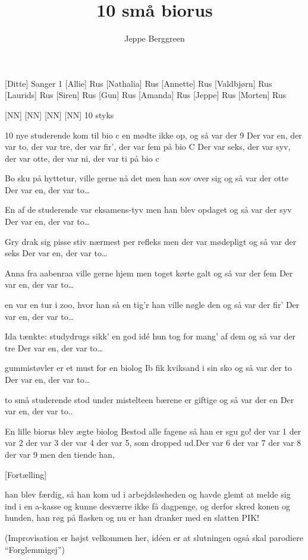 \documentclass[a4paper,11pt]{article}
\title{10 små biorus}
\author{Jeppe Berggreen}
\begin{document}
\maketitle

\begin{roles}
    [Ditte] Sanger 1
    [Allie] Rus
    [Nathalia] Rus
    [Annette] Rus
    [Valdbjørn] Rus
    [Laurids] Rus
    [Siren] Rus
    [Gun] Rus
    [Amanda] Rus
    [Jeppe] Rus
    [Morten] Rus
\end{roles}

\begin{props}
    [NN] 
    [NN] 
    [NN] 
    [NN] 10 styks
\end{props}

\begin{song}
10 nye studerende kom til bio c 
en mødte ikke op, og så var der 9
Der var en, der var to,
der var tre, der var fir’,
der var fem på bio C
Der var seks, der var syv,
der var otte, der var ni,
der var ti på bio c

Bo sku på hyttetur, ville gerne nå det
men han sov over sig og så var der otte
Der var en, der var to…

En af de studerende var eksamens-tyv
men han blev opdaget og så var der syv
Der var en, der var to…

Gry drak sig pisse stiv nærmest per refleks
men der var mødepligt og så var der seks
Der var en, der var to…

Anna fra aabenraa ville gerne hjem
men toget kørte galt og så var der fem
Der var en, der var to…

en var en tur i zoo, hvor han så en tig’r
han ville nøgle den og så var der fir’
Der var en, der var to…

Ida tænkte: studydrugs sikk’ en god idé
hun tog for mang' af dem og så var der tre
Der var en, der var to…

gummistøvler er et must for en biolog
Ib fik kviksand i sin sko og så var der to
Der var en, der var to…

to små studerende stod under mistelteen
bærene er giftige og så var der en
Der var en, der var to..

En lille biorus blev ægte biolog
Bestod alle fagene så han er sgu go!
der var 1 der var 2 der var 3 der var 4 der var 5, som dropped ud.Der var 6 der var 7 der var 8 der var 9 men den tiende han, 

[Fortælling] 

han blev færdig, så han kom ud i arbejdsløsheden og havde glemt at melde sig ind i en a-kasse og kunne desværre ikke få dagpenge, og derfor skred konen og hunden, han røg på flasken og nu er han dranker med en slatten PIK!

\scene (Improvisation er højst velkommen her, idéen er at slutningen også skal parodiere “Forglemmigej”)
\end{song}
\end{document}
